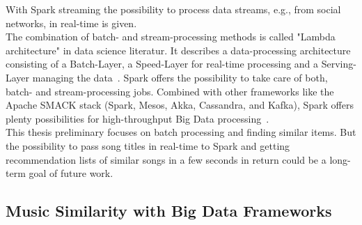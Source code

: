 With Spark streaming the possibility to process data streams, e.g., from social networks, in real-time is given.\\
The combination of batch- and stream-processing methods is called "Lambda architecture" in data science literatur. It describes a data-processing architecture consisting of a Batch-Layer, a Speed-Layer for real-time processing and a Serving-Layer managing the data~\cite[pp. 8f]{nextgenbig}. Spark offers the possibility to take care of both, batch- and stream-processing jobs. Combined with other frameworks like the Apache SMACK stack (Spark, Mesos, Akka, Cassandra, and Kafka), Spark offers plenty possibilities for high-throughput Big Data processing~\cite[p. 5]{smack}.\\
This thesis preliminary focuses on batch processing and finding similar items. But the possibility to pass song titles in real-time to Spark and getting recommendation lists of similar songs in a few seconds in return could be a long-term goal of future work.\\

\subsection{Music Similarity with Big Data Frameworks}

